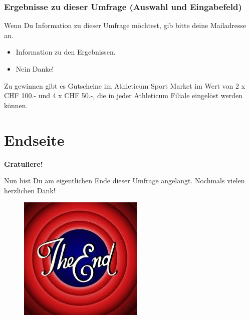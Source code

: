\subsubsection*{Ergebnisse zu dieser Umfrage (Auswahl und Eingabefeld)}
Wenn Du Information zu dieser Umfrage möchtest, gib bitte deine Mailadresse an.
    \begin{itemize}
      \item Information zu den Ergebnissen.
      \item Nein Danke!      
    \end{itemize}
Zu gewinnen gibt es Gutscheine im Athleticum Sport Market im Wert von 2 x CHF 100.- und 4 x CHF 50.-, die in jeder Athleticum Filiale eingelöst werden können.
\section{Endseite}\label{anhangSection.endseite}
\textbf{Gratuliere!}\par
Nun bist Du am eigentlichen Ende dieser Umfrage angelangt. Nochmals vielen herzlichen Dank!
\begin{figure}[h]
     \centering
     \includegraphics[scale=0.6]{images/anhang/ende.jpeg}
\end{figure}    
    